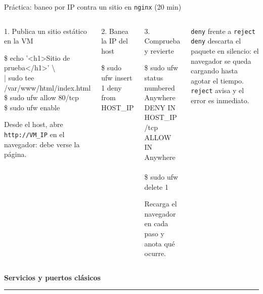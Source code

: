 \documentclass[aspectratio=169,10pt,c]{beamer}
\begin{document}
\begin{frame}{Práctica: baneo por IP contra un sitio en \texttt{nginx} \textnormal{\small(20 min)}}
\begin{columns}[T,onlytextwidth]
\begin{exampleblock}{1. Publica un sitio estático en la VM}
\begin{terminal}\scriptsize
\$ echo '<h1>Sitio de prueba</h1>' \textbackslash\\
\quad | sudo tee /var/www/html/index.html\\
\$ sudo ufw allow 80/tcp\\
\$ sudo ufw enable
\end{terminal}
\small Desde el host, abre \texttt{http://VM\_IP} en el navegador: debe verse la página.
\end{exampleblock}
\begin{exampleblock}{2. Banea la IP del host}
\begin{terminal}\scriptsize
\$ sudo ufw insert 1 deny from HOST\_IP
\end{terminal}
\end{exampleblock}
\begin{exampleblock}{3. Comprueba y revierte}
\begin{terminal}\scriptsize
\$ sudo ufw status numbered\\
\rbrack Anywhere  DENY IN  HOST\_IP\\
/tcp    ALLOW IN Anywhere\\
~\\
\$ sudo ufw delete 1
\end{terminal}
\small Recarga el navegador en cada paso y anota qué ocurre.
\end{exampleblock}
\begin{block}{\texttt{deny} frente a \texttt{reject}}
\small \texttt{deny} descarta el paquete en silencio: el navegador se queda cargando hasta agotar el tiempo. \texttt{reject} avisa y el error es inmediato.
\end{block}
\end{columns}
\end{frame}

\begin{frame}[plain]
\vfill
\begin{center}
{\fontsize{29}{34}\selectfont\bfseries Servicios y puertos clásicos}\par
\vspace{4mm}
{\color{utpRojo}\rule{8.5cm}{1.2pt}}
\end{center}
\vfill
\end{frame}
\end{document}

